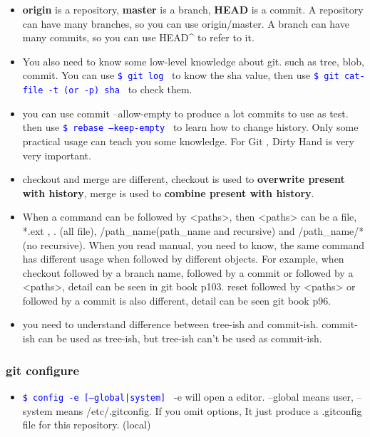 \documentclass[a4paper,12pt,twoside]{book}
\newcommand{\linuxcommand}[1]{\texttt{\textcolor{blue}{\$ #1 \Pisymbol{psy}{191}}}}
\begin{document}
\begin{itemize}
\begin{itemize}
\begin{itemize}
	\item \textbf{origin} is a repository, \textbf{master} is a branch, \textbf{HEAD} is a commit. A repository can have many branches, so you can use origin/master. A branch can have many commits, so you can use HEAD\^{} to refer to it.
    
 \item You also need to know some low-level knowledge about git. such as tree, blob,  commit. You can use \linuxcommand{git log} to know the sha value, then use \linuxcommand{git cat-file -t (or -p) sha} to check them. 
    
    \item you can use commit --allow-empty to produce a lot commits to use as test. then use
        \linuxcommand{rebase --keep-empty } to learn how to change history. Only some practical usage can teach you some knowledge. For Git , Dirty Hand is very very important.
        
        \item checkout and merge are different, checkout is used to \textbf{overwrite present with history}, merge is used to \textbf{combine present with history}.
        
         \item When a command can be followed by <paths>, then <paths> can be a file, *.ext ,  . (all file),  /path\_name(path\_name and recursive) and /path\_name/*(no recursive).  When you read manual, you need to know, the same command has different usage when followed by different objects. For example, when checkout followed by a branch name, followed by a commit or followed by a <paths>, detail can be seen in git book p103.  reset followed by <paths> or followed by a commit is also different, detail can be seen git book p96. 
         
         \item you need to understand difference between tree-ish and commit-ish. commit-ish can be used as tree-ish, but tree-ish can't be used as commit-ish. 
                 
\end{itemize}

\subsubsection{git configure}
    \begin{itemize}

  \item \linuxcommand{config -e [--global|system]}  -e will open a editor. --global means user, --system means /etc/.gitconfig.   If you omit options, It just produce a .gitconfig file for this repository. (local)


\end{itemize}
\end{itemize}
\end{itemize}
\end{document}

